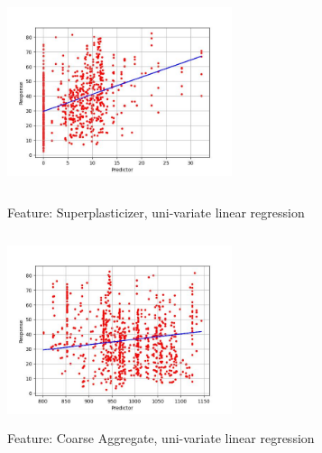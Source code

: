 \documentclass{article}
\begin{document}
\begin{figure}[!h]
    \centering
    \begin{minipage}[t]{0.49\textwidth}
        \centering
        \includegraphics[height = 5.6cm, width=6.6cm]{images/4.jpg}
        \caption{Feature: Superplasticizer, uni-variate linear regression}
        \label{fig:4}
    \end{minipage}
    \begin{minipage}[t]{0.49\textwidth}
        \centering
        \includegraphics[height = 5.6cm, width=6.6cm]{images/5.jpg}
        \caption{Feature: Coarse Aggregate, uni-variate linear regression}
        \label{fig:5}
    \end{minipage}
\end{figure}
\end{document}

